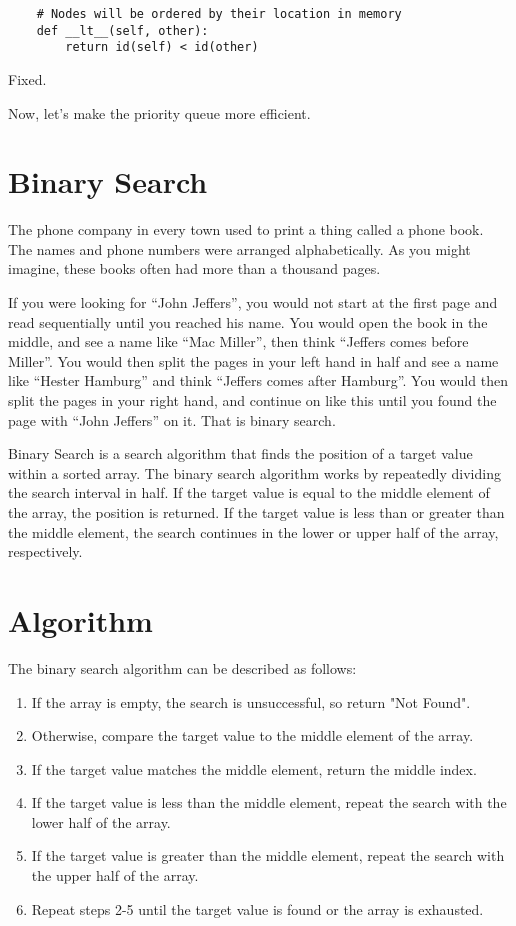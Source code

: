 \begin{verbatim}
    # Nodes will be ordered by their location in memory
    def __lt__(self, other):
        return id(self) < id(other)
\end{verbatim}

Fixed.

Now, let's make the priority queue more efficient.

\section{Binary Search}

The phone company in every town used to print a thing called a phone
book. The names and phone numbers were arranged alphabetically.  As
you might imagine, these books often had more than a thousand pages.

If you were looking for ``John Jeffers'', you would not start at the
first page and read sequentially until you reached his name.  You
would open the book in the middle, and see a name like ``Mac Miller'',
then think ``Jeffers comes before Miller''. You would then split
the pages in your left hand in half and see a name like ``Hester
Hamburg'' and think ``Jeffers comes after Hamburg''. You would then
split the pages in your right hand, and continue on like this until you found the page
with ``John Jeffers'' on it.
That is binary search.

Binary Search is a search algorithm that finds the position of a target value within a sorted array. The binary search algorithm works by repeatedly dividing the search interval in half. If the target value is equal to the middle element of the array, the position is returned. If the target value is less than or greater than the middle element, the search continues in the lower or upper half of the array, respectively.

\section{Algorithm}

The binary search algorithm can be described as follows:
\begin{enumerate}
\item If the array is empty, the search is unsuccessful, so return "Not Found".
\item Otherwise, compare the target value to the middle element of the array.
\item If the target value matches the middle element, return the middle index.
\item If the target value is less than the middle element, repeat the search with the lower half of the array.
\item If the target value is greater than the middle element, repeat the search with the upper half of the array.
\item Repeat steps 2-5 until the target value is found or the array is exhausted.
\end{enumerate}


